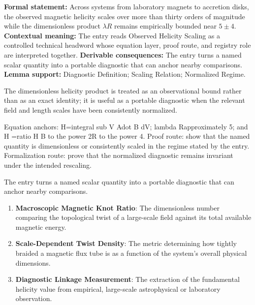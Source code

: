 \begingroup\footnotesize\setlength{\emergencystretch}{3em}\sloppy
\textbf{Formal statement:} Across systems from laboratory magnets to accretion disks, the observed magnetic helicity scales over more than thirty orders of magnitude while the dimensionless product \(\lambda R\) remains empirically bounded near \(5\pm4\). \textbf{Contextual meaning:} The entry reads Observed Helicity Scaling as a controlled technical headword whose equation layer, proof route, and registry role are interpreted together. \textbf{Derivable consequences:} The entry turns a named scalar quantity into a portable diagnostic that can anchor nearby comparisons. \textbf{Lemma support:} Diagnostic Definition; Scaling Relation; Normalized Regime.\par
\endgroup

The dimensionless helicity product is treated as an observational bound rather than as an exact identity; it is useful as a portable diagnostic when the relevant field and length scales have been consistently normalized.

Equation anchors: H=integral sub V Adot B dV; lambda Rapproximately 5; and H =ratio H B to the power 2R to the power 4. Proof route: show that the named quantity is dimensionless or consistently scaled in the regime stated by the entry. Formalization route: prove that the normalized diagnostic remains invariant under the intended rescaling.

The entry turns a named scalar quantity into a portable diagnostic that can anchor nearby comparisons.
\endgroup

\begin{enumerate}[leftmargin=1.6em,itemsep=6pt,topsep=4pt]
\item \textbf{Macroscopic Magnetic Knot Ratio}: The dimensionless number comparing the topological twist of a large-scale field against its total available magnetic energy.
\item \textbf{Scale-Dependent Twist Density}: The metric determining how tightly braided a magnetic flux tube is as a function of the system's overall physical dimensions.
\item \textbf{Diagnostic Linkage Measurement}: The extraction of the fundamental helicity value from empirical, large-scale astrophysical or laboratory observation.
\end{enumerate}

